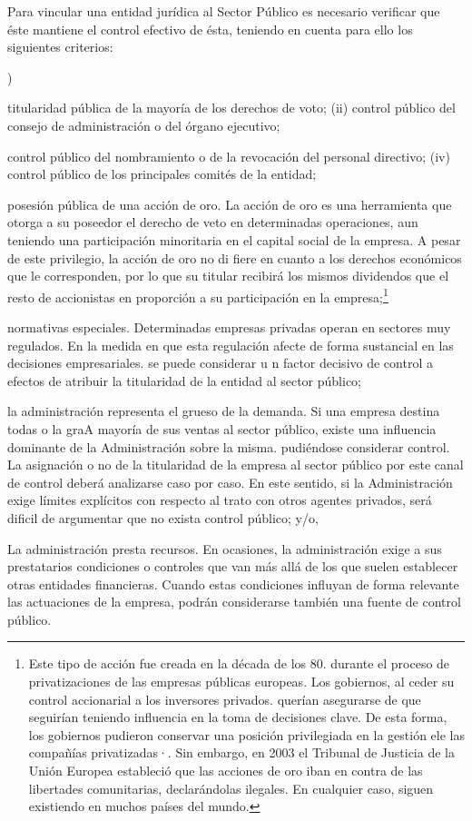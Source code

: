 \documentclass[10pt,a4paper]{article}
\newcounter{alphaitem}
\newenvironment{la}
      {\begin{list}{\alph{alphaitem})}{%
          \usecounter{alphaitem}%
          \setlength{\leftmargin}{1cm}%
          \setlength{\parskip}{3pt}%
          \setlength{\itemsep}{0pt}%
          \setlength{\parsep}{0pt}%
      }}
      {\end{list}}
\begin{document}
Para vincular una entidad jurídica al Sector Público es necesario verificar que éste mantiene el control efectivo de ésta, teniendo en cuenta para ello los siguientes criterios:
\begin{la}
    \item titularidad pública de la mayoría de los derechos de voto; (ii) control público del consejo de administración o del órgano ejecutivo;
    \item control público del nombramiento o de la revocación del personal directivo; (iv) control público de los principales comités de la entidad;
    \item posesión pública de una acción de oro. La acción de oro es una herramienta que otorga a su poseedor el derecho de veto en determinadas operaciones, aun teniendo una participación minoritaria en el capital social de la empresa. A pesar de este privilegio, la acción de oro no di fiere en cuanto a los derechos económicos que le corresponden, por lo que su titular recibirá los mismos dividendos que el resto de accionistas en proporción a su participación en la empresa;\footnote{%
        Este tipo de acción fue creada en la década de los 80. durante el proceso de privatizaciones de las empresas públicas europeas. Los gobiernos, al ceder su control accionarial a los inversores privados. querían asegurarse de que seguirían teniendo influencia en la toma de decisiones clave. De esta forma, los gobiernos pudieron conservar una posición privilegiada en la gestión ele las compañías privatizadas·. Sin embargo, en 2003 el Tribunal de Justicia de la Unión Europea estableció que las acciones de oro iban en contra de las libertades comunitarias, declarándolas ilegales. En cualquier caso, siguen existiendo en muchos países del mundo.
    }
    \item normativas especiales. Determinadas empresas privadas operan en sectores muy regulados. En la medida en que esta regulación afecte de forma sustancial en las decisiones empresariales. se puede considerar u n factor decisivo de control a efectos de atribuir la titularidad de la entidad al sector público;
    \item la administración representa el grueso de la demanda. Si una empresa destina todas o la graA mayoría de sus ventas al sector público, existe una influencia dominante de la Administración sobre la misma. pudiéndose considerar control. La asignación o no de la titularidad de la empresa al sector público por este canal de control deberá analizarse caso por caso. En este sentido, si la Administración exige límites explícitos con respecto al trato con otros agentes privados, será dificil de argumentar que no exista control público; y/o, 
    \item La administración presta recursos. En ocasiones, la administración exige a sus prestatarios condiciones o controles que van más allá de los que suelen establecer otras entidades financieras. Cuando estas condiciones influyan de forma relevante las actuaciones de la empresa, podrán considerarse también una fuente de control público.
\end{la} 
\end{document}
